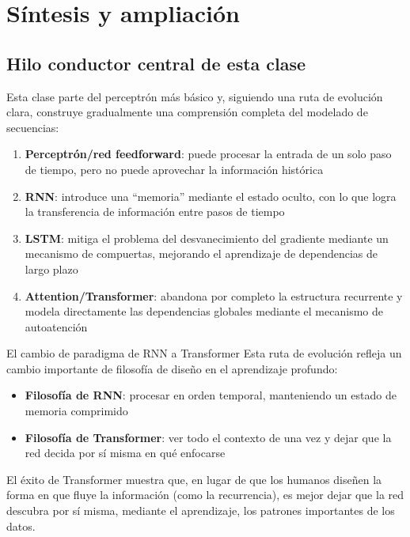 \section{Síntesis y ampliación}

\subsection{Hilo conductor central de esta clase}

Esta clase parte del perceptrón más básico y, siguiendo una ruta de evolución clara, construye gradualmente una comprensión completa del modelado de secuencias:

\begin{enumerate}
    \item \textbf{Perceptrón/red feedforward}: puede procesar la entrada de un solo paso de tiempo, pero no puede aprovechar la información histórica
    \item \textbf{RNN}: introduce una ``memoria'' mediante el estado oculto, con lo que logra la transferencia de información entre pasos de tiempo
    \item \textbf{LSTM}: mitiga el problema del desvanecimiento del gradiente mediante un mecanismo de compuertas, mejorando el aprendizaje de dependencias de largo plazo
    \item \textbf{Attention/Transformer}: abandona por completo la estructura recurrente y modela directamente las dependencias globales mediante el mecanismo de autoatención
\end{enumerate}

\begin{importantbox}{El cambio de paradigma de RNN a Transformer}
Esta ruta de evolución refleja un cambio importante de filosofía de diseño en el aprendizaje profundo:
\begin{itemize}
    \item \textbf{Filosofía de RNN}: procesar en orden temporal, manteniendo un estado de memoria comprimido
    \item \textbf{Filosofía de Transformer}: ver todo el contexto de una vez y dejar que la red decida por sí misma en qué enfocarse
\end{itemize}
El éxito de Transformer muestra que, en lugar de que los humanos diseñen la forma en que fluye la información (como la recurrencia), es mejor dejar que la red descubra por sí misma, mediante el aprendizaje, los patrones importantes de los datos.
\end{importantbox}

